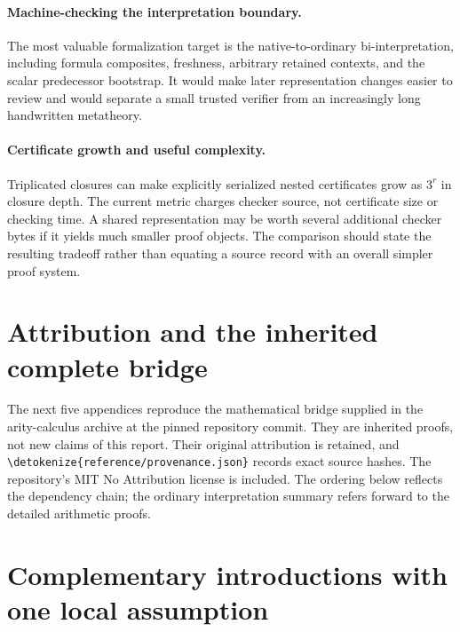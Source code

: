 \documentclass[11pt,letterpaper]{article}
\theoremstyle{definition}\newtheorem{definition}[theorem]{Definition}
\theoremstyle{remark}\newtheorem{remark}[theorem]{Remark}
\newcommand{\file}[1]{\expandafter\nolinkurl\expandafter{\detokenize{#1}}}
\begin{document}
\paragraph{Machine-checking the interpretation boundary.}
The most valuable formalization target is the native-to-ordinary
bi-interpretation, including formula composites, freshness, arbitrary
retained contexts, and the scalar predecessor bootstrap. It would make
later representation changes easier to review and would separate a small
trusted verifier from an increasingly long handwritten metatheory.

\paragraph{Certificate growth and useful complexity.}
Triplicated closures can make explicitly serialized nested certificates
grow as $3^r$ in closure depth. The current metric charges checker source,
not certificate size or checking time. A shared representation may be
worth several additional checker bytes if it yields much smaller proof
objects. The comparison should state the resulting tradeoff rather than
equating a source record with an overall simpler proof system.

\clearpage
\appendix
\section*{Attribution and the inherited complete bridge}

The next five appendices reproduce the mathematical bridge supplied in
the arity-calculus archive at the pinned repository commit. They are
inherited proofs, not new claims of this report. Their original attribution
is retained, and \file{reference/provenance.json} records exact source
hashes. The repository's MIT No Attribution license is included.
The ordering below reflects the dependency chain; the ordinary
interpretation summary refers forward to the detailed arithmetic proofs.


\section{Complementary introductions with one local assumption}
\label{sec:choice-introduction}
\end{document}
